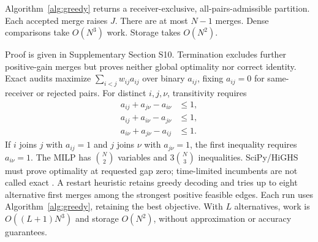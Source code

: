 \begin{Proposition}\label{prop:greedy}
Algorithm~\ref{alg:greedy} returns a receiver-exclusive, all-pairs-admissible partition. Each accepted merge raises $J$. There are at most $N-1$ merges. Dense comparisons take $O(N^3)$ work. Storage takes $O(N^2)$.
\end{Proposition}
Proof is given in Supplementary Section S10.
Termination excludes further positive-gain merges but proves neither global optimality nor correct identity. Exact audits maximize $\sum_{i<j}w_{ij}a_{ij}$ over binary $a_{ij}$, fixing $a_{ij}=0$ for same-receiver or rejected pairs. For distinct $i,j,\nu$, transitivity requires
\begin{equation}
 \begin{aligned}
 a_{ij}+a_{j\nu}-a_{i\nu}&\leq1,\\
 a_{ij}+a_{i\nu}-a_{j\nu}&\leq1,\\
 a_{i\nu}+a_{j\nu}-a_{ij}&\leq1.
 \end{aligned}\label{eq:triangle}
\end{equation}
If $i$ joins $j$ with $a_{ij}=1$ and $j$ joins $\nu$ with $a_{j\nu}=1$, the first inequality requires $a_{i\nu}=1$.
The MILP has $\binom N2$ variables and $3\binom N3$ inequalities. SciPy/HiGHS must prove optimality at requested gap zero; time-limited incumbents are not called exact \cite{scipy}. A restart heuristic retains greedy decoding and tries up to eight alternative first merges among the strongest positive feasible edges. Each run uses Algorithm~\ref{alg:greedy}, retaining the best objective. With $L$ alternatives, work is $O((L+1)N^3)$ and storage $O(N^2)$, without approximation or accuracy guarantees.

\FloatBarrier
